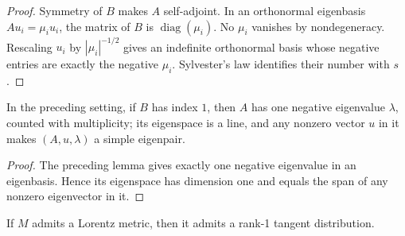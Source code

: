\begin{proof}

\sketch Symmetry of $B$ makes $A$ self-adjoint. In an orthonormal eigenbasis
$Au_i=\mu_i u_i$, the matrix of $B$ is $\operatorname{diag}(\mu_i)$. No $\mu_i$
vanishes by nondegeneracy. Rescaling $u_i$ by $|\mu_i|^{-1/2}$ gives an
indefinite orthonormal basis whose negative entries are exactly the negative
$\mu_i$. Sylvester's law identifies their number with $s$.
\end{proof}

\begin{lemma}
\label{lem:simple-eigenpair-of-index-one}





In the preceding setting, if $B$ has index $1$, then $A$ has one negative
eigenvalue $\lambda$, counted with multiplicity; its eigenspace is a line, and
any nonzero vector $u$ in it makes $(A,u,\lambda)$ a simple eigenpair.
\end{lemma}

\begin{proof}

\sketch The preceding lemma gives exactly one negative eigenvalue in an eigenbasis.
Hence its eigenspace has dimension one and equals the span of any nonzero
eigenvector in it.
\end{proof}

\begin{proposition}
\label{prop:rank-one-distribution-of-lorentz-metric}





If $M$ admits a Lorentz metric, then it admits a rank-1 tangent distribution.
\end{proposition}

